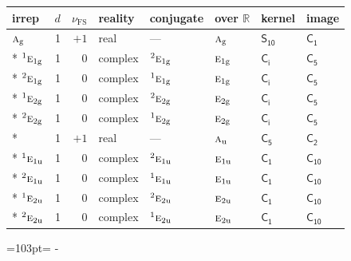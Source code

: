 \documentclass[10pt,a4paper]{article}
\newcommand{\needspace}[1]{\par\penalty-100\begingroup\dimen0=#1\relax\dimen2=\pagegoal
  \advance\dimen2-\pagetotal\ifdim\dimen0>\dimen2\relax\ifdim\dimen2>0pt\vfil\break\fi\fi
  \endgroup}
\numberwithin{equation}{section}
\newcommand{\grp}[1]{\mathsf{#1}}
\newcommand{\irr}[1]{\text{\normalfont\scshape #1}}
\newcommand{\conjpair}[1]{{}^{#1}}
\newcommand{\detbox}[1]{{\setlength{\fboxsep}{1pt}\fbox{#1}}}
\newcommand{\ptag}[1]{\mathrm{#1}}
\newcommand{\fsind}{\nu_{\mathrm{FS}}}
\begin{document}
{\small\renewcommand{\arraystretch}{1.25}\setlength{\tabcolsep}{4pt}\begin{longtable}{@{}lrrlllll@{}}\toprule
irrep & $d$ & $\fsind$ & reality & conjugate & over $\mathbb{R}$ & kernel & image\\\midrule\endhead
\bottomrule\endfoot\endlastfoot
$\irr{a}_{\ptag{g}}$ & 1 & $+1$ & real & --- & $\irr{a}_{\ptag{g}}$ & \href{S10.pdf}{$\grp{S_{10}}$} & \href{C1.pdf}{$\grp{C_{1}}$}\\*
$\conjpair{1}\irr{e}_{1\ptag{g}}$ & 1 & $0$ & complex & $\conjpair{2}\irr{e}_{1\ptag{g}}$ & $\irr{e}_{1\ptag{g}}$ & \href{S2.pdf}{$\grp{C_{i}}$} & \href{C5.pdf}{$\grp{C_{5}}$}\\*
$\conjpair{2}\irr{e}_{1\ptag{g}}$ & 1 & $0$ & complex & $\conjpair{1}\irr{e}_{1\ptag{g}}$ & $\irr{e}_{1\ptag{g}}$ & \href{S2.pdf}{$\grp{C_{i}}$} & \href{C5.pdf}{$\grp{C_{5}}$}\\*
$\conjpair{1}\irr{e}_{2\ptag{g}}$ & 1 & $0$ & complex & $\conjpair{2}\irr{e}_{2\ptag{g}}$ & $\irr{e}_{2\ptag{g}}$ & \href{S2.pdf}{$\grp{C_{i}}$} & \href{C5.pdf}{$\grp{C_{5}}$}\\*
$\conjpair{2}\irr{e}_{2\ptag{g}}$ & 1 & $0$ & complex & $\conjpair{1}\irr{e}_{2\ptag{g}}$ & $\irr{e}_{2\ptag{g}}$ & \href{S2.pdf}{$\grp{C_{i}}$} & \href{C5.pdf}{$\grp{C_{5}}$}\\*
\detbox{$\irr{a}_{\ptag{u}}$} & 1 & $+1$ & real & --- & $\irr{a}_{\ptag{u}}$ & \href{C5.pdf}{$\grp{C_{5}}$} & \href{C2.pdf}{$\grp{C_{2}}$}\\*
$\conjpair{1}\irr{e}_{1\ptag{u}}$ & 1 & $0$ & complex & $\conjpair{2}\irr{e}_{1\ptag{u}}$ & $\irr{e}_{1\ptag{u}}$ & \href{C1.pdf}{$\grp{C_{1}}$} & \href{C10.pdf}{$\grp{C_{10}}$}\\*
$\conjpair{2}\irr{e}_{1\ptag{u}}$ & 1 & $0$ & complex & $\conjpair{1}\irr{e}_{1\ptag{u}}$ & $\irr{e}_{1\ptag{u}}$ & \href{C1.pdf}{$\grp{C_{1}}$} & \href{C10.pdf}{$\grp{C_{10}}$}\\*
$\conjpair{1}\irr{e}_{2\ptag{u}}$ & 1 & $0$ & complex & $\conjpair{2}\irr{e}_{2\ptag{u}}$ & $\irr{e}_{2\ptag{u}}$ & \href{C1.pdf}{$\grp{C_{1}}$} & \href{C10.pdf}{$\grp{C_{10}}$}\\*
$\conjpair{2}\irr{e}_{2\ptag{u}}$ & 1 & $0$ & complex & $\conjpair{1}\irr{e}_{2\ptag{u}}$ & $\irr{e}_{2\ptag{u}}$ & \href{C1.pdf}{$\grp{C_{1}}$} & \href{C10.pdf}{$\grp{C_{10}}$}\\
\bottomrule\end{longtable}}
\needspace{103pt}
\end{document}
